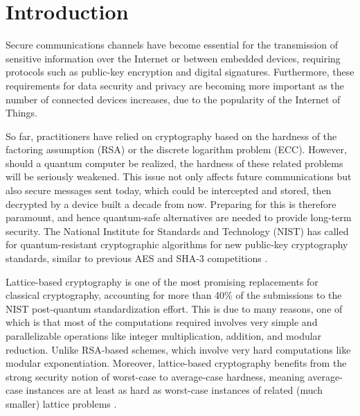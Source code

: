 \section{Introduction}

Secure communications channels have become essential for the transmission of
sensitive information over the Internet or between embedded devices, requiring
protocols such as public-key encryption and digital signatures. Furthermore, these
requirements for data security and privacy are becoming more important as the number of connected devices increases, due to the popularity of the Internet of Things.

So far, practitioners have relied on cryptography based on the hardness of the
factoring assumption (RSA) or the discrete logarithm problem (ECC).
However, should a quantum computer be realized, the hardness of these related
problems will be seriously weakened. This issue not only affects future communications
but also secure messages sent today, which could be intercepted and
stored, then decrypted by a device built a decade from now. Preparing for this is
therefore paramount, and hence quantum-safe alternatives are needed to provide
long-term security. The National Institute for Standards and Technology (NIST) has called for quantum-resistant cryptographic algorithms for new public-key cryptography standards, similar to previous AES and SHA-3 competitions \cite{chen2016report}.

Lattice-based cryptography is one of the most promising replacements for classical cryptography, accounting for more than 40\% of the submissions to the NIST post-quantum standardization effort. This is due to many reasons, one of which is that most of the computations required involves very simple and parallelizable operations like integer multiplication, addition, and modular reduction. Unlike RSA-based schemes, which involve very hard computations like modular exponentiation. Moreover, lattice-based cryptography benefits from the strong security notion of worst-case to average-case hardness, meaning average-case instances are at least as hard as worst-case instances of related (much smaller) lattice problems \cite{DBLP:conf/crypto/MicciancioP13}.

